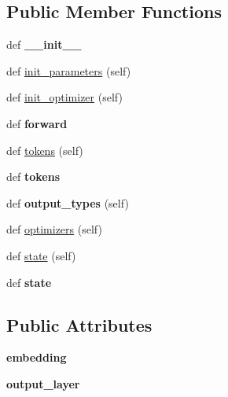 \subsection*{Public Member Functions}
\begin{DoxyCompactItemize}
\item 
def {\bfseries \+\_\+\+\_\+init\+\_\+\+\_\+}\hypertarget{classrnn_1_1RNNDecoder_a424ea5c438f12efa31ba3dc4d4cb628c}{}\label{classrnn_1_1RNNDecoder_a424ea5c438f12efa31ba3dc4d4cb628c}

\item 
def \hyperlink{classrnn_1_1RNNDecoder_a60321859a13a7667137697d77fc6e0d1}{init\+\_\+parameters} (self)
\item 
def \hyperlink{classrnn_1_1RNNDecoder_a19d15f860b465d8eff3930b3967852ca}{init\+\_\+optimizer} (self)
\item 
def {\bfseries forward}\hypertarget{classrnn_1_1RNNDecoder_a6f35d37355ea12b2e71d4ee0ad51ef4b}{}\label{classrnn_1_1RNNDecoder_a6f35d37355ea12b2e71d4ee0ad51ef4b}

\item 
def \hyperlink{classrnn_1_1RNNDecoder_a0e1540d19918f79cc9ad4760ca348f2c}{tokens} (self)
\item 
def {\bfseries tokens}\hypertarget{classrnn_1_1RNNDecoder_a2ea8a72c02cb4ac6fc2e56261025d4ae}{}\label{classrnn_1_1RNNDecoder_a2ea8a72c02cb4ac6fc2e56261025d4ae}

\item 
def {\bfseries output\+\_\+types} (self)\hypertarget{classrnn_1_1RNNDecoder_af29ff3b4a0ce6ee5e966f3c2f7857b6a}{}\label{classrnn_1_1RNNDecoder_af29ff3b4a0ce6ee5e966f3c2f7857b6a}

\item 
def \hyperlink{classrnn_1_1RNNDecoder_a40ca6971fd2dda889274b3a0d460e741}{optimizers} (self)
\item 
def \hyperlink{classrnn_1_1RNNDecoder_aafc7dd5fa82994667420a211291570b9}{state} (self)
\item 
def {\bfseries state}\hypertarget{classrnn_1_1RNNDecoder_a81e77827be7dba4508b78e42fe61dfd1}{}\label{classrnn_1_1RNNDecoder_a81e77827be7dba4508b78e42fe61dfd1}

\end{DoxyCompactItemize}
\subsection*{Public Attributes}
\begin{DoxyCompactItemize}
\item 
{\bfseries embedding}\hypertarget{classrnn_1_1RNNDecoder_a66599c7bd125464dce7e16f3281677d8}{}\label{classrnn_1_1RNNDecoder_a66599c7bd125464dce7e16f3281677d8}

\item 
{\bfseries output\+\_\+layer}\hypertarget{classrnn_1_1RNNDecoder_a119f6f09c9c0b2bebe9b18231fbf96c9}{}\label{classrnn_1_1RNNDecoder_a119f6f09c9c0b2bebe9b18231fbf96c9}

\end{DoxyCompactItemize}
